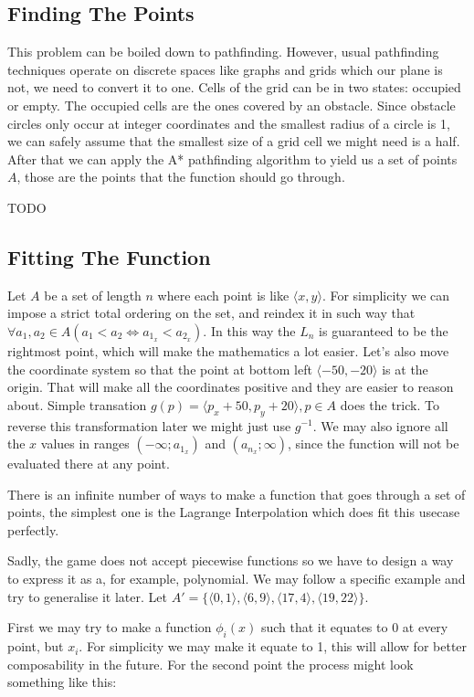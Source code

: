 \documentclass[12pt, titlepage]{article}
\newcommand{\TODO}{\begin{center}\color{red}TODO\end{center}}
\begin{document}
\subsection{Finding The Points}
This problem can be boiled down to pathfinding. However, usual pathfinding
techniques operate on discrete spaces like graphs and grids which our plane
is not, we need to convert it to one. Cells of the grid can be in two states:
occupied or empty. The occupied cells are the ones covered by an obstacle. 
Since obstacle circles only occur at integer coordinates and the smallest
radius of a circle is 1, we can safely assume that the smallest size of a grid
cell we might need is a half. After that we can apply the A* pathfinding
algorithm to yield us a set of points $A$, those are the points that the
function should go through. 

\TODO{}

\subsection{Fitting The Function}
Let $A$ be a set of length $n$ where each point is like $\langle x, y \rangle$.
For simplicity we can impose a strict total ordering on the set, and reindex
it in such way that $\forall a_1,a_2 \in A (a_1 < a_2 \Leftrightarrow a_{1_x} < 
a_{2_x})$. In this way the $L_n$ is guaranteed to be the rightmost point, which
will make the mathematics a lot easier. Let's also move the coordinate system
so that the point at bottom left $\langle -50, -20 \rangle$ is at the origin.
That will make all the coordinates positive and they are easier to reason about.
Simple transation $g(p) = \langle p_x + 50, p_y + 20 \rangle, p \in A$ does the
trick. To reverse this transformation later we might just use $g^{-1}$. We may
also ignore all the $x$ values in ranges 
$(-\infty; a_{1_x})$ and $(a_{n_x}; \infty)$, since the function will not be 
evaluated there at any point.

There is an infinite number of ways to make a function that goes through a set of
points, the simplest one is the Lagrange Interpolation which does fit this 
usecase perfectly.

Sadly, the game does not accept piecewise functions so we have to design a
way to express it as a, for example, polynomial.
We may follow a specific example and try to generalise it later. 
Let $A' = \{\langle 0, 1 \rangle, \langle 6, 9 \rangle, 
\langle 17, 4 \rangle, \langle 19, 22 \rangle\}$.

First we may try to make a function $\phi_i(x)$ such that it equates to 0 at
every point, but $x_i$. For simplicity we may make it equate to 1, this will
allow for better composability in the future. For the second point the process
might look something like this:
\end{document}
